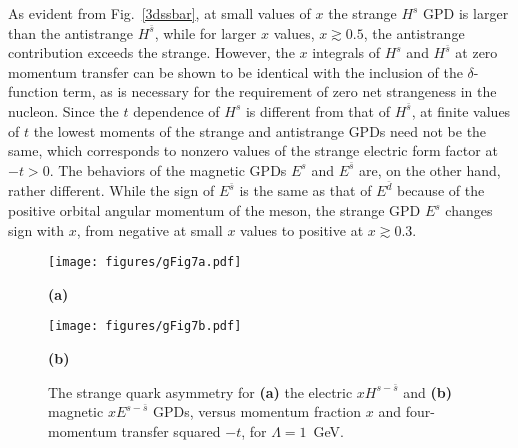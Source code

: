 \documentclass[preprintnumbers,prd,superscriptaddress,preprint]{revtex4-1}
\begin{document}
As evident from Fig.~\ref{3dssbar}, at small values of $x$ the strange $H^s$ GPD is larger than the antistrange $H^{\bar{s}}$, while for larger $x$ values, $x \gtrsim 0.5$, the antistrange contribution exceeds the strange.
However, the $x$ integrals of $H^s$ and $H^{\bar{s}}$ at zero momentum transfer can be shown to be identical with the inclusion of the $\delta$-function term, as is necessary for the requirement of zero net strangeness in the nucleon.
Since the $t$ dependence of $H^s$ is different from that of $H^{\bar{s}}$, at finite values of $t$ the lowest moments of the strange and antistrange GPDs need not be the same, which corresponds to nonzero values of the strange electric form factor at $-t > 0$.
%
The behaviors of the magnetic GPDs $E^s$ and $E^{\bar{s}}$ are, on the other hand, rather different.
While the sign of $E^{\bar{s}}$ is the same as that of $E^{\bar{d}}$ because of the positive orbital angular momentum of the meson, the strange GPD $E^s$ changes sign with $x$, from negative at small $x$ values to positive at $x \gtrsim 0.3$.




\begin{figure}[t] %
\centering 
    \begin{minipage}{0.45\linewidth}
        \centering
        \centerline{
        \texttt{[image: figures/gFig7a.pdf]}
        }
        \centerline{\small{\bf{(a)}}}
    \end{minipage}
    \begin{minipage}{0.45\linewidth}
        \centering
        \centerline{
        \texttt{[image: figures/gFig7b.pdf]}
        }
        \centerline{\small{\bf{(b)}}}
    \end{minipage}
\caption{The strange quark asymmetry for {\bf (a)} the electric $xH^{s-\bar{s}}$ and {\bf (b)} magnetic $xE^{s-\bar{s}}$ GPDs, versus momentum fraction $x$ and four-momentum transfer squared $-t$, for $\Lambda = 1$~GeV.}
\label{3ds-sbar}  
\end{figure}
\end{document}
